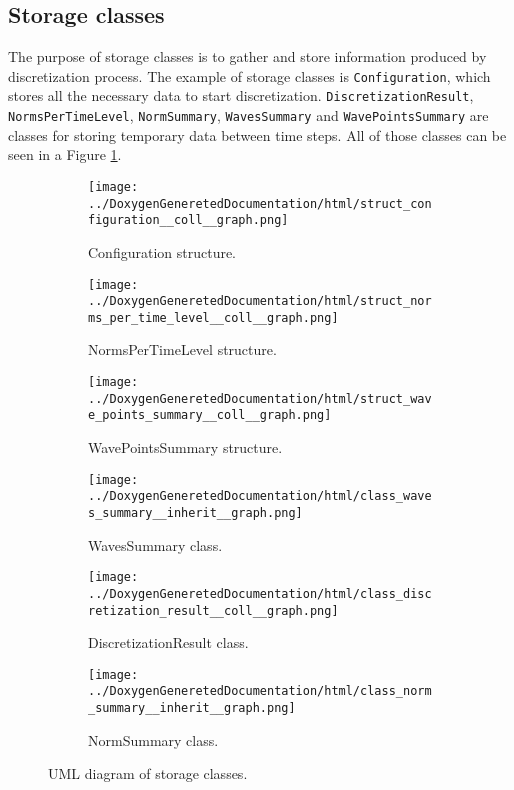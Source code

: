 	\subsection{Storage classes}
		The purpose of storage classes is to gather and store information produced by discretization process. The example of storage classes is \texttt{Configuration}, which stores all the necessary data to start discretization. \texttt{DiscretizationResult}, \texttt{NormsPerTimeLevel}, \texttt{NormSummary}, \texttt{WavesSummary} and \texttt{WavePointsSummary} are classes for storing temporary data between time steps. All of those classes can be seen in a Figure \ref{fig:storage}.
		\begin{figure}[!hbtp]
			\begin{subfigure}[t]{0.33\textwidth}
				\centering
				\texttt{[image: ../DoxygenGeneretedDocumentation/html/struct\_configuration\_\_coll\_\_graph.png]}
				\caption{Configuration structure.}
			\end{subfigure}
			\begin{subfigure}[t]{0.33\textwidth}
				\centering
				\texttt{[image: ../DoxygenGeneretedDocumentation/html/struct\_norms\_per\_time\_level\_\_coll\_\_graph.png]}
				\caption{NormsPerTimeLevel structure.}
			\end{subfigure}	
		\begin{subfigure}[t]{0.33\textwidth}
			\centering
			\texttt{[image: ../DoxygenGeneretedDocumentation/html/struct\_wave\_points\_summary\_\_coll\_\_graph.png]}
			\caption{WavePointsSummary structure.}
		\end{subfigure}
	
		\begin{subfigure}[t]{0.33\textwidth}
			\centering
			\texttt{[image: ../DoxygenGeneretedDocumentation/html/class\_waves\_summary\_\_inherit\_\_graph.png]}
			\caption{WavesSummary class.}
		\end{subfigure}
		\begin{subfigure}[t]{0.33\textwidth}
			\centering
			\texttt{[image: ../DoxygenGeneretedDocumentation/html/class\_discretization\_result\_\_coll\_\_graph.png]}
			\caption{DiscretizationResult class.}
		\end{subfigure}
		\begin{subfigure}[t]{0.33\textwidth}
			\centering
			\texttt{[image: ../DoxygenGeneretedDocumentation/html/class\_norm\_summary\_\_inherit\_\_graph.png]}
			\caption{NormSummary class.}
		\end{subfigure}
			\caption{UML diagram of storage classes.}
			\label{fig:storage}
		\end{figure}
